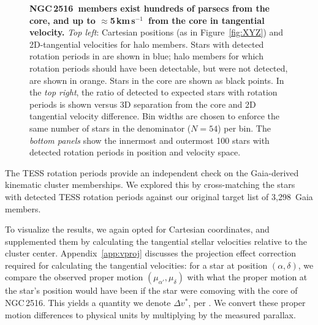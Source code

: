 \documentclass[12pt,twocolumn,tighten]{aastex63}
\newcommand{\cn}{NGC\,2516} %
\newcommand{\nkinematic}{3{,}298} %
\newcommand{\kms}{\,km\,s$^{-1}$}
\begin{document}
\begin{figure}[tp]
\begin{center}
	\end{center}
	\vspace{-0.7cm}
  \caption{ 
  {\bf \cn\ members exist hundreds of parsecs from the core, and up
  to $\approx$5\kms\ from the core in tangential velocity.} {\it Top
  left}: Cartesian positions (as in Figure~\ref{fig:XYZ}) and
  2D-tangential velocities for halo members.  Stars with detected
  rotation periods in  are shown in blue;  halo
  members for which rotation periods should have been detectable, but
  were not detected, are shown in orange.  Stars in the core are shown
  as black points.  In
  the {\it top right}, the 
  ratio of detected to expected stars with rotation periods  is shown
  versus 3D separation from
  the core and 2D tangential velocity difference.  Bin widths are
  chosen to enforce the same number of stars in the denominator
  ($N=54$) per bin.  The {\it bottom panels} show the innermost and
  outermost 100 stars with detected rotation periods in position and
  velocity space.
  \label{fig:physical_x_rotn}
	}
\end{figure}

The TESS rotation periods provide an independent check on the
Gaia-derived kinematic cluster memberships.  We explored this by
cross-matching the stars with detected TESS rotation periods against
our original target list of \nkinematic\ Gaia members.  

To visualize the results, we again opted for Cartesian coordinates,
and supplemented them by calculating the tangential stellar velocities
relative to the cluster center.  Appendix~\ref{app:vproj} discusses
the projection effect correction required for calculating the
tangential velocities: for a star at position $(\alpha, \delta)$, we
compare the observed proper motion $(\mu_{\alpha'}, \mu_\delta)$ with
what the proper motion at the star's position would have been if the
star were comoving with the core of \cn.  This yields a quantity we
denote $\Delta v^{*}$, per .  We convert
these proper motion differences to physical units by multiplying by
the measured parallax.  

\end{document}
